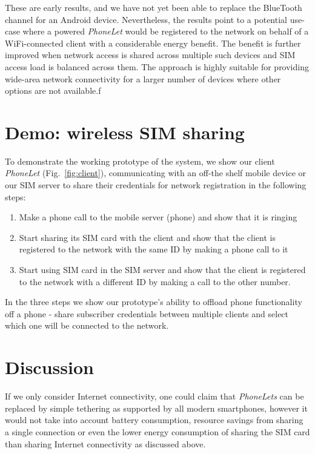 \documentclass{sig-alternate-10pt}
\begin{document}
These are early results, and we have not yet been able to replace the BlueTooth channel for an Android device. Nevertheless, the results point to a potential use-case where a powered \emph{PhoneLet} would be registered to the network on behalf of a WiFi-connected client with a considerable energy benefit. The benefit is further improved when network access is shared across multiple such devices and SIM access load is balanced across them. The approach is highly suitable for providing wide-area network connectivity for a larger number of devices where other options are not available.f

\section{Demo: wireless SIM sharing}

To demonstrate the working prototype of the system, we show our client \emph{PhoneLet} (Fig.~\ref{fig:client}), communicating with an off-the shelf mobile device or our SIM server to share their credentials for network registration in the following steps:

\begin{enumerate}
    \item Make a phone call to the mobile server (phone) and show that it is ringing
    \item Start sharing its SIM card with the client and show that the client is registered to the network with the same ID by making a phone call to it
    \item Start using SIM card in the SIM server and show that the client is registered to the network with a different ID by making a call to the other number.
\end{enumerate}

In the three steps we show our prototype's ability to offload phone functionality off a phone - share subscriber credentials between multiple clients and select which one will be connected to the network.

\section{Discussion}

If we only consider Internet connectivity, one could claim that \emph{PhoneLets} can be replaced by simple tethering as supported by all modern smartphones, however it would not take into account battery consumption, resource savings from sharing a single connection or even the lower energy consumption of sharing the SIM card than sharing Internet connectivity as discussed above.
\end{document}
